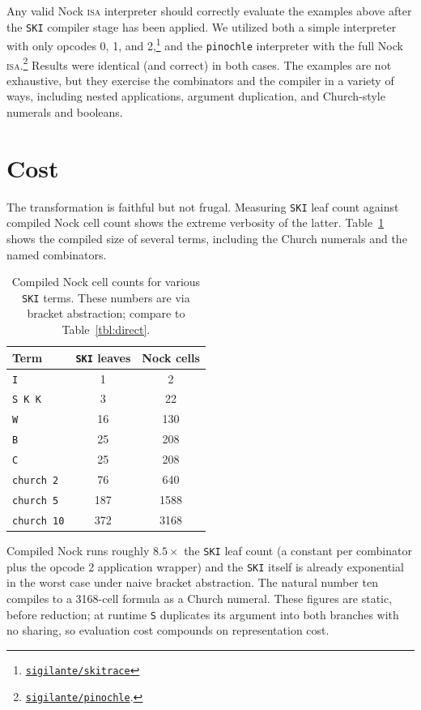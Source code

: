 \documentclass[twoside]{article}
\begin{document}
Any valid Nock \textsc{isa} interpreter should correctly evaluate the examples above after the \texttt{SKI} compiler stage has been applied.  We utilized both a simple interpreter with only opcodes 0, 1, and 2,\footnote{\href{https://github.com/sigilante/skitrace}{\texttt{sigilante/skitrace}}} and the \texttt{pinochle} interpreter with the full Nock \textsc{isa}.\footnote{\href{https://github.com/sigilante/pinochle}{\texttt{sigilante/pinochle}}.}  Results were identical (and correct) in both cases.  The examples are not exhaustive, but they exercise the combinators and the compiler in a variety of ways, including nested applications, argument duplication, and Church-style numerals and booleans.

\section{Cost}
\label{sxn:cost}

The transformation is faithful but not frugal. Measuring \texttt{SKI} leaf count against compiled Nock cell count shows the extreme verbosity of the latter.  Table~\ref{tbl:cost} shows the compiled size of several terms, including the Church numerals and the named combinators.

\begin{table}
\caption{Compiled Nock cell counts for various \texttt{SKI} terms.  These numbers are via bracket abstraction; compare to Table~\ref{tbl:direct}.}
\label{tbl:cost}
\centering
\begin{tabular}{lcc}
\hline \hline
Term & \texttt{SKI} leaves & Nock cells \\
\hline
\texttt{I} & 1 & 2 \\
\texttt{S K K} & 3 & 22 \\
\texttt{W} & 16 & 130 \\
\texttt{B} & 25 & 208 \\
\texttt{C} & 25 & 208 \\
\texttt{church 2} & 76 & 640 \\
\texttt{church 5} & 187 & 1588 \\
\texttt{church 10} & 372 & 3168 \\
\hline
\end{tabular}
\end{table}

Compiled Nock runs roughly $8.5\times$ the \texttt{SKI} leaf count (a constant per combinator plus the opcode 2 application wrapper) and the \texttt{SKI} itself is already exponential in the worst case under naive bracket abstraction.  The natural number ten compiles to a 3168-cell formula as a Church numeral.  These figures are static, before reduction; at runtime \texttt{S} duplicates its argument into both branches with no sharing, so evaluation cost compounds on representation cost.
\end{document}
